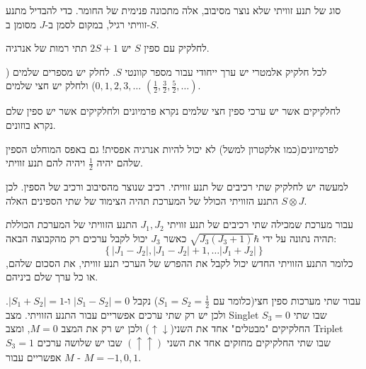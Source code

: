 \documentclass{tstextbook}
\begin{document}
\begin{definition}[ספין]
סוג של תנע זוויתי שלא נוצר מסיבוב, אלה מתכונה פנימית של החומר. כדי להבדיל מתנע זוויתי רגיל, במקום לסמן ב-\(J\) מסומן ב-\(S\).

\end{definition}
\begin{proposition}
לחלקיק עם ספין \(S\) יש \(2S+1\) תתי רמות של אנרגיה.

\end{proposition}
\begin{proposition}
לכל חלקיק אלמטרי יש ערך ייחודי עבור מספר קוונטי \(S\). לחלק יש מספרים שלמים (\(0,1,2,3,\dots\)) ולחלק יש חצי שלמים \(\left( \frac{1}{2},\frac{3}{2},\frac{5}{2},\dots \right)\).

\end{proposition}
\begin{definition}
לחלקיקים אשר יש ערכי ספין חצי שלמים נקרא פרמיונים ולחלקיקים אשר יש ספין שלם נקרא בוזונים.

\end{definition}
\begin{corollary}
לפרמיונים(כמו אלקטרון למשל) לא יכול להיות אנרגיה אפסית! גם באפס המוחלט הספין שלהם יהיה \(\frac{1}{2}\) ויהיה להם תנע זוויתי.

\end{corollary}
\begin{remark}
למעשה יש לחלקיק שתי רכיבים של תנע זוויתי. רכיב שנוצר מהסיבוב ורכיב של הספין. לכן התנע הזוויתי הכולל של המערכת תהיה הצימוד של שתי הספינים האלה \(S\otimes J\).

\end{remark}
\begin{proposition}
עבור מערכת שמכילה שתי רכיבים של תנע זוויתי \(J_{1},J_{2}\) התנע הזוויתי של המערכת הכוללת תהיה נתונה על ידי \(\sqrt{J_{3}(J_{3}+1) }\hbar\) כאשר \(J_{3}\) יכול לקבל ערכים רק מהקבוצה הבאה:
$$\left\{  \lvert J_{1} -J_{2}\rvert   , \lvert J_{1}-J_{2} \rvert +1,\dots \lvert J_{1}+J_{2} \rvert \right\}$$
כלומר התנע הזוויתי החדש יכול לקבל את ההפרש של הערכי תנע זוויתי, את הסכום שלהם, או כל ערך שלם ביניהם.

\end{proposition}
\begin{example}
עבור שתי מערכות ספין חצי(כלומר עם \(S_{1}=S_{2}=\frac{1}{2}\))  נקבל \(\lvert S_{1}-S_{2} \rvert=0\) ו-\(\lvert S_{1}+S_{2} \rvert=1\). ולכן יש רק שתי ערכים אפשריים עבור התנע הזוויתי. מצב Singlet \(S_{3}=0\) שבו שתי החלקיקים "מבטלים" אחד את השני(\(\uparrow\downarrow\)) ולכן יש רק את המצב \(M=0\), ומצב Triplet \(S_{3}=1\) שבו שתי החלקיקים מחזקים אחד את השני \(\left( \uparrow\uparrow \right)\) שבו יש שלושה ערכים אפשריים עבור \(M\) - \(M=-1,0,1\).

\end{example}
\end{document}
